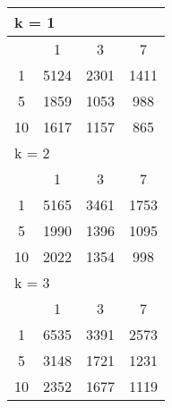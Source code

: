 \begin{table}
 \begin{tabular}{|*4{c|}}
\hline
\multicolumn{4}{|l|}{k = 1} \\
\hline
\multirow{1}{*}{\diagbox{$\mu$}{$\lambda$}} & \multicolumn{1}{c|}{1} & \multicolumn{1}{c|}{3} & \multicolumn{1}{c|}{7} \\
\hline
1 & 5124 & 2301 & 1411 \\
\hline
5 & 1859 & 1053 & 988 \\
\hline
10 & 1617 & 1157 & 865 \\
\hline
\multicolumn{4}{|l|}{k = 2} \\
\hline
\multirow{1}{*}{\diagbox{$\mu$}{$\lambda$}} & \multicolumn{1}{c|}{1} & \multicolumn{1}{c|}{3} & \multicolumn{1}{c|}{7} \\
\hline
1 & 5165 & 3461 & 1753 \\
\hline
5 & 1990 & 1396 & 1095 \\
\hline
10 & 2022 & 1354 & 998 \\
\hline
\multicolumn{4}{|l|}{k = 3} \\
\hline
\multirow{1}{*}{\diagbox{$\mu$}{$\lambda$}} & \multicolumn{1}{c|}{1} & \multicolumn{1}{c|}{3} & \multicolumn{1}{c|}{7} \\
\hline
1 & 6535 & 3391 & 2573 \\
\hline
5 & 3148 & 1721 & 1231 \\
\hline
10 & 2352 & 1677 & 1119 \\
\hline
\end{tabular}
\end{table}


